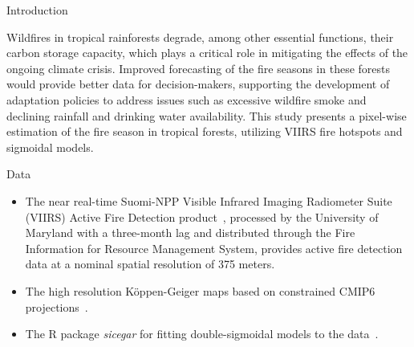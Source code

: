 \documentclass[20pt]{beamer}
\begin{document}
\vspace*{-2cm}
\begin{frame}[fragile,t]
\begin{columns}[t]



\begin{column}{0.33\linewidth}

    \vspace{1.0cm}

    \begin{block}{Introduction\vphantom{g}}

    \vspace{1.0cm}

Wildfires in tropical rainforests degrade, among other essential functions, their carbon storage capacity, which plays a critical role in mitigating the effects of the ongoing climate crisis.
Improved forecasting of the fire seasons in these forests would provide better data for decision-makers, supporting the development of adaptation policies to address issues such as excessive wildfire smoke and declining rainfall and drinking water availability.
This study presents a pixel-wise estimation of the fire season in tropical forests, utilizing VIIRS fire hotspots and sigmoidal models.

    \end{block}

    \vspace{0.5cm}

    \begin{block}{Data\vphantom{g}}

\vspace{1.0cm}

\begin{itemize}
    \item The near real-time Suomi-NPP Visible Infrared Imaging Radiometer Suite (VIIRS) Active Fire Detection product~\cite{nasaviirslandscienceteam2020}, processed by the University of Maryland with a three-month lag and distributed through the Fire Information for Resource Management System, provides active fire detection data at a nominal spatial resolution of 375 meters.
    \item The high resolution K\"{o}ppen-Geiger maps based on constrained CMIP6 projections~\cite{beck2023}.
    \item The R package \textit{sicegar} for fitting double-sigmoidal models to the data~\cite{caglar2018}.
\end{itemize}


\end{block}
\end{column}
\end{columns}
\end{frame}
\end{document}
